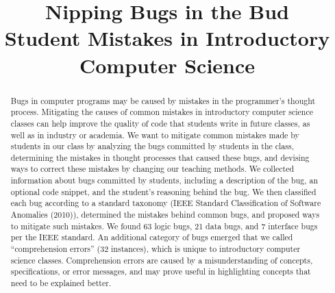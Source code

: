 \documentclass{sig-alternate}
\begin{document}
\title{Nipping Bugs in the Bud\\ Student Mistakes in Introductory Computer Science}
\author{
\alignauthor
}
\maketitle

\setcounter{page}{1}

\def\numlogicIEEE{66 }
\def\numdataIEEE{24 }
\def\numinterfaceIEEE{7 }
\def\numotherIEEE{26 }

\def\numlogic{63 }
\def\numdata{21 }
\def\numinterface{7 }
\def\numcomp{32 }
\def\numtotal{123 }
\def\numedge{31 }

\begin{abstract}
Bugs in computer programs may be caused by mistakes in the programmer's thought process. Mitigating the causes of common mistakes in introductory computer science classes can help improve the quality of code that students write in future classes, as well as in industry or academia. We want to mitigate common mistakes made by students in our class by analyzing the bugs committed by students in the class, determining the mistakes in thought processes that caused these bugs, and devising ways to correct these mistakes by changing our teaching methods. We collected information about bugs committed by students, including a description of the bug, an optional code snippet, and the student's reasoning behind the bug. We then classified each bug according to a standard taxonomy (IEEE Standard Classification of Software Anomalies (2010)), determined the mistakes behind common bugs, and proposed ways to mitigate such mistakes. We found \numlogic logic bugs, \numdata data bugs, and \numinterface interface bugs per the IEEE standard. An additional category of bugs emerged that we called ``comprehension errors'' (\numcomp instances), which is unique to introductory computer science classes. Comprehension errors are caused by a misunderstanding of concepts, specifications, or error messages, and may prove useful in highlighting concepts that need to be explained better.

\end{abstract}
\end{document}

